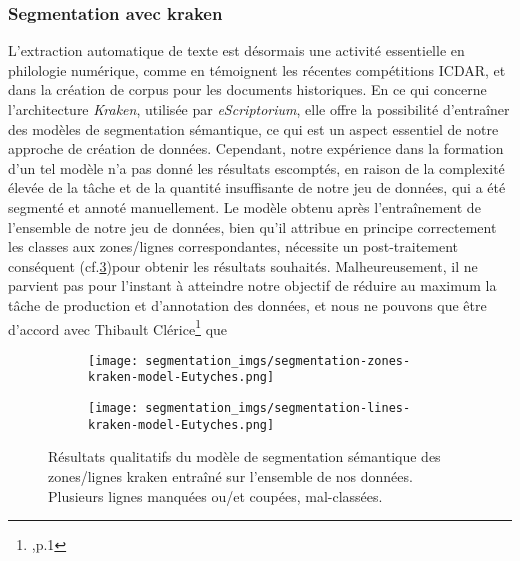 \documentclass[a4paper, twoside, 12pt]{book}
\begin{document}
\subsubsection{Segmentation avec kraken}

L'extraction automatique de texte est désormais une activité essentielle en philologie numérique, comme en témoignent les récentes compétitions ICDAR, et dans la création de corpus pour les documents historiques. En ce qui concerne l'architecture \textit{Kraken}, utilisée par \textit{eScriptorium}, elle offre la possibilité d'entraîner des modèles de segmentation sémantique, ce qui est un aspect essentiel de notre approche de création de données. Cependant, notre expérience dans la formation d'un tel modèle n'a pas donné les résultats escomptés, en raison de la complexité élevée de la tâche et de la quantité insuffisante de notre jeu de données, qui a été segmenté et annoté manuellement. Le modèle obtenu après l'entraînement de l'ensemble de notre jeu de données, bien qu'il attribue en principe correctement les classes aux zones/lignes correspondantes, nécessite un post-traitement conséquent (cf.\ref{segmentation-kraken})pour obtenir les résultats souhaités. Malheureusement, il ne parvient pas pour l'instant à atteindre notre objectif de réduire au maximum la tâche de production et d'annotation des données, et nous ne pouvons que être d'accord avec Thibault Clérice\footnote{\cite{clerice2022YALTAi},p.1} que 

\begin{figure}[H]
    \centering
    \begin{subfigure}[b]{0.5\textwidth}
        \centering
        \texttt{[image: segmentation\_imgs/segmentation-zones-kraken-model-Eutyches.png]}
        \label{fig:sub1}
    \end{subfigure}%
    \begin{subfigure}[b]{0.5\textwidth}
        \centering
        \texttt{[image: segmentation\_imgs/segmentation-lines-kraken-model-Eutyches.png]}
        \label{fig:sub2}
    \end{subfigure}
    \caption{Résultats qualitatifs du modèle de segmentation sémantique des zones/lignes kraken entraîné sur l'ensemble de nos données. Plusieurs lignes manquées ou/et coupées, mal-classées.}
    \label{segmentation-kraken}
\end{figure}
\end{document}
